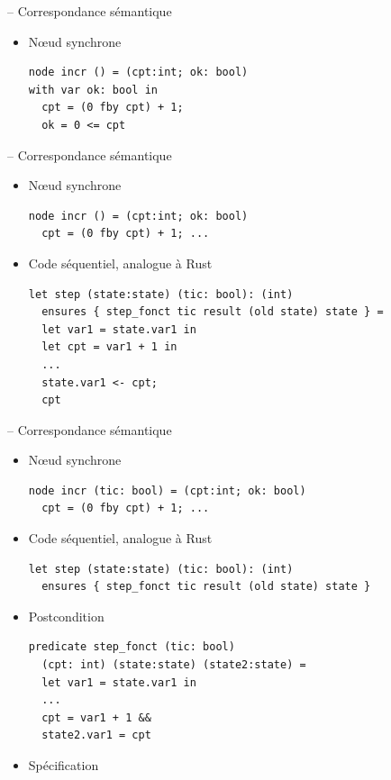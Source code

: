 \documentclass[11pt,usenames,dvipsnames]{beamer}
\begin{document}
\begin{frame}[fragile]{-- Correspondance sémantique}
\begin{itemize}
\item Nœud synchrone
  \begin{lstlisting}[language=minils]
node incr () = (cpt:int; ok: bool)
with var ok: bool in
  cpt = (0 fby cpt) + 1;
  ok = 0 <= cpt\end{lstlisting}
  \end{itemize}
\end{frame}

\begin{frame}[fragile]{-- Correspondance sémantique}
\begin{itemize}
\item Nœud synchrone
  \begin{lstlisting}[language=minils]
node incr () = (cpt:int; ok: bool)
  cpt = (0 fby cpt) + 1; ...\end{lstlisting}
\item Code séquentiel, analogue à Rust
  \begin{lstlisting}[language=why3]
let step (state:state) (tic: bool): (int)
  ensures { step_fonct tic result (old state) state } =
  let var1 = state.var1 in
  let cpt = var1 + 1 in
  ...
  state.var1 <- cpt;
  cpt
  \end{lstlisting}
\end{itemize}
\end{frame}

\begin{frame}[fragile]{-- Correspondance sémantique}
\begin{itemize}
\item Nœud synchrone
  \begin{lstlisting}[language=minils]
node incr (tic: bool) = (cpt:int; ok: bool)
  cpt = (0 fby cpt) + 1; ...\end{lstlisting}
\item Code séquentiel, analogue à Rust
  \begin{lstlisting}[language=why3]
let step (state:state) (tic: bool): (int)
  ensures { step_fonct tic result (old state) state }\end{lstlisting}
\item Postcondition
  \begin{lstlisting}[language=why3]
predicate step_fonct (tic: bool)
  (cpt: int) (state:state) (state2:state) =
  let var1 = state.var1 in
  ...
  cpt = var1 + 1 &&
  state2.var1 = cpt\end{lstlisting}
\item Spécification
\end{itemize}
\end{frame}
\end{document}
